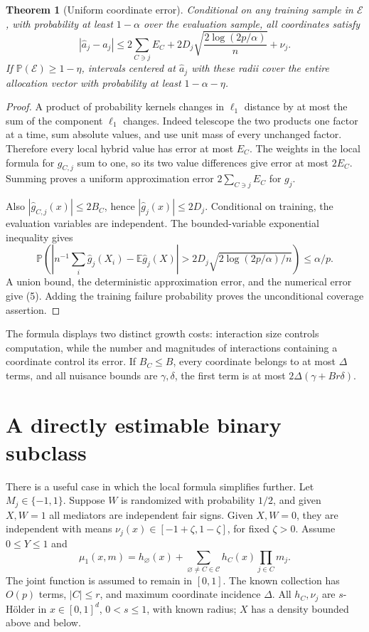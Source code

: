\documentclass[11pt,a4paper]{article}
\newtheorem{theorem}{Theorem}[section]
\theoremstyle{definition}
\theoremstyle{remark}
\newcommand{\E}{\mathbb E}
\newcommand{\Prb}{\mathbb P}
\begin{document}
\begin{theorem}[Uniform coordinate error]
Conditional on any training sample in $\mathcal E$, with probability at least $1-\alpha$ over the evaluation sample, all coordinates satisfy
\[
 |\hat a_j-a_j|\le
 2\sum_{C\ni j}E_C+
 2D_j\sqrt{\frac{2\log(2p/\alpha)}n}+\nu_j.
 \tag{5}
\]
If $\Prb(\mathcal E)\ge1-\eta$, intervals centered at $\hat a_j$ with these radii cover the entire allocation vector with probability at least $1-\alpha-\eta$.
\end{theorem}
\begin{proof}
A product of probability kernels changes in $\ell_1$ distance by at most the sum of the component $\ell_1$ changes. Indeed telescope the two products one factor at a time, sum absolute values, and use unit mass of every unchanged factor. Therefore every local hybrid value has error at most $E_C$. The weights in the local formula for $g_{C,j}$ sum to one, so its two value differences give error at most $2E_C$. Summing proves a uniform approximation error $2\sum_{C\ni j}E_C$ for $g_j$.

Also $|\hat g_{C,j}(x)|\le2B_C$, hence $|\hat g_j(x)|\le2D_j$. Conditional on training, the evaluation variables are independent. The bounded-variable exponential inequality gives
\[
 \Prb\left(\left|n^{-1}\sum_i\hat g_j(X_i)-\E\hat g_j(X)\right|
 >2D_j\sqrt{2\log(2p/\alpha)/n}\right)\le\alpha/p.
\]
A union bound, the deterministic approximation error, and the numerical error give (5). Adding the training failure probability proves the unconditional coverage assertion.
\end{proof}

The formula displays two distinct growth costs: interaction size controls computation, while the number and magnitudes of interactions containing a coordinate control its error. If $B_C\le B$, every coordinate belongs to at most $\Delta$ terms, and all nuisance bounds are $\gamma,\delta$, the first term is at most $2\Delta(\gamma+Br\delta)$.

\section{A directly estimable binary subclass}
There is a useful case in which the local formula simplifies further. Let $M_j\in\{-1,1\}$. Suppose $W$ is randomized with probability $1/2$, and given $X,W=1$ all mediators are independent fair signs. Given $X,W=0$, they are independent with means $\nu_j(x)\in[-1+\zeta,1-\zeta]$, for fixed $\zeta>0$. Assume $0\le Y\le1$ and
\[
 \mu_1(x,m)=h_\varnothing(x)+
          \sum_{\varnothing\ne C\in\mathcal C}h_C(x)\prod_{j\in C}m_j.
 \tag{6}
\]
The joint function is assumed to remain in $[0,1]$. The known collection has $O(p)$ terms, $|C|\le r$, and maximum coordinate incidence $\Delta$. All $h_C,\nu_j$ are $s$-H\"older in $x\in[0,1]^d$, $0<s\le1$, with known radius; $X$ has a density bounded above and below.
\end{document}
